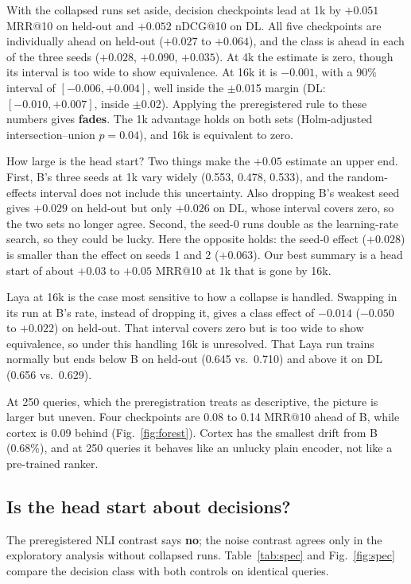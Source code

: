 \documentclass[journal]{IEEEtran}
\makeatletter
\newcommand{\ms}{MRR@10}
\newcommand{\nd}{nDCG@10}
\makeatother
\begin{document}
With the collapsed runs set aside, decision checkpoints lead at 1k by $+0.051$ \ms{} on held-out and $+0.052$ \nd{} on DL. All five checkpoints are individually ahead on held-out ($+0.027$ to $+0.064$), and the class is ahead in each of the three seeds ($+0.028$, $+0.090$, $+0.035$). At 4k the estimate is zero, though its interval is too wide to show equivalence. At 16k it is $-0.001$, with a 90\% interval of $[-0.006,+0.004]$, well inside the $\pm$0.015 margin (DL: $[-0.010,+0.007]$, inside $\pm$0.02). Applying the preregistered rule to these numbers gives \textbf{fades}. The 1k advantage holds on both sets (Holm-adjusted intersection--union $p=0.04$), and 16k is equivalent to zero.

How large is the head start? Two things make the $+0.05$ estimate an upper end. First, B's three seeds at 1k vary widely (0.553, 0.478, 0.533), and the random-effects interval does not include this uncertainty. Also dropping B's weakest seed gives $+0.029$ on held-out but only $+0.026$ on DL, whose interval covers zero, so the two sets no longer agree. Second, the seed-0 runs double as the learning-rate search, so they could be lucky. Here the opposite holds: the seed-0 effect ($+0.028$) is smaller than the effect on seeds 1 and 2 ($+0.063$). Our best summary is a head start of about $+0.03$ to $+0.05$ \ms{} at 1k that is gone by 16k.

Laya at 16k is the case most sensitive to how a collapse is handled. Swapping in its run at B's rate, instead of dropping it, gives a class effect of $-0.014$ ($-0.050$ to $+0.022$) on held-out. That interval covers zero but is too wide to show equivalence, so under this handling 16k is unresolved. That Laya run trains normally but ends below B on held-out (0.645 vs.\ 0.710) and above it on DL (0.656 vs.\ 0.629).

At 250 queries, which the preregistration treats as descriptive, the picture is larger but uneven. Four checkpoints are 0.08 to 0.14 \ms{} ahead of B, while cortex is 0.09 behind (Fig.~\ref{fig:forest}). Cortex has the smallest drift from B (0.68\%), and at 250 queries it behaves like an unlucky plain encoder, not like a pre-trained ranker.

\subsection{Is the head start about decisions?}
\label{sec:specific}

The preregistered NLI contrast says \textbf{no}; the noise contrast agrees only in the exploratory analysis without collapsed runs. Table~\ref{tab:spec} and Fig.~\ref{fig:spec} compare the decision class with both controls on identical queries.
\end{document}
